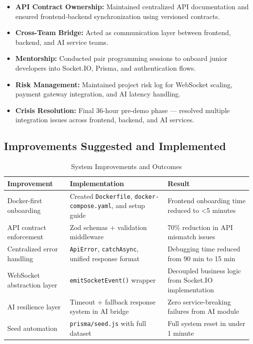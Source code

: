 \begin{itemize}
\item \textbf{API Contract Ownership:} Maintained centralized API documentation and ensured frontend-backend synchronization using versioned contracts.
\item \textbf{Cross-Team Bridge:} Acted as communication layer between frontend, backend, and AI service teams.
\item \textbf{Mentorship:} Conducted pair programming sessions to onboard junior developers into Socket.IO, Prisma, and authentication flows.
\item \textbf{Risk Management:} Maintained project risk log for WebSocket scaling, payment gateway integration, and AI latency handling.
\item \textbf{Crisis Resolution:} Final 36-hour pre-demo phase --- resolved multiple integration issues across frontend, backend, and AI services.
\end{itemize}

\subsection{Improvements Suggested and Implemented}

\begin{table}[H]
\centering
\caption{System Improvements and Outcomes}
\label{tab:improvements}
\begin{tabularx}{\textwidth}{@{}p{}X p{}@{}}
\toprule
\textbf{Improvement} & \textbf{Implementation} & \textbf{Result} \\
\midrule

Docker-first onboarding &
Created \texttt{Dockerfile}, \texttt{docker-compose.yaml}, and setup guide &
Frontend onboarding time reduced to <5 minutes \\

API contract enforcement &
Zod schemas + validation middleware &
70\% reduction in API mismatch issues \\

Centralized error handling &
\texttt{ApiError}, \texttt{catchAsync}, unified response format &
Debugging time reduced from 90 min to 15 min \\

WebSocket abstraction layer &
\texttt{emitSocketEvent()} wrapper &
Decoupled business logic from Socket.IO implementation \\

AI resilience layer &
Timeout + fallback response system in AI bridge &
Zero service-breaking failures from AI module \\

Seed automation &
\texttt{prisma/seed.js} with full dataset &
Full system reset in under 1 minute \\

\bottomrule
\end{tabularx}
\end{table}

